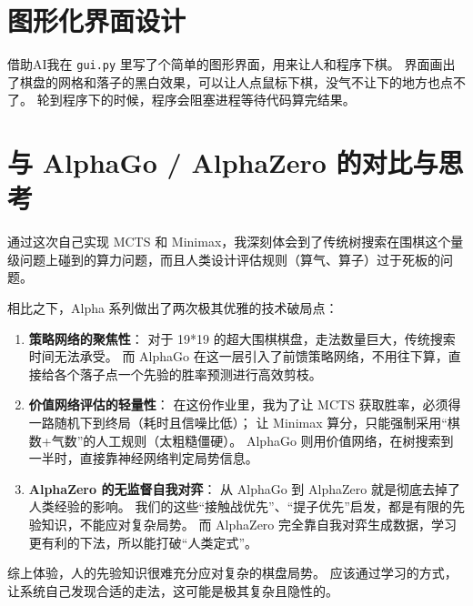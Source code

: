 \documentclass[12pt,a4paper,UTF8]{ctexart}
\begin{document}
\section{图形化界面设计}
借助AI我在 \texttt{gui.py} 里写了个简单的图形界面，用来让人和程序下棋。
界面画出了棋盘的网格和落子的黑白效果，可以让人点鼠标下棋，没气不让下的地方也点不了。
轮到程序下的时候，程序会阻塞进程等待代码算完结果。

\section{与 AlphaGo / AlphaZero 的对比与思考}
通过这次自己实现 MCTS 和 Minimax，我深刻体会到了传统树搜索在围棋这个量级问题上碰到的算力问题，而且人类设计评估规则（算气、算子）过于死板的问题。

相比之下，Alpha 系列做出了两次极其优雅的技术破局点：
\begin{enumerate}
    \item \textbf{策略网络的聚焦性}：
    对于 19*19 的超大围棋棋盘，走法数量巨大，传统搜索时间无法承受。
    而 AlphaGo 在这一层引入了前馈策略网络，不用往下算，直接给各个落子点一个先验的胜率预测进行高效剪枝。
    \item \textbf{价值网络评估的轻量性}：
    在这份作业里，我为了让 MCTS 获取胜率，必须得一路随机下到终局（耗时且信噪比低）；
    让 Minimax 算分，只能强制采用“棋数+气数”的人工规则（太粗糙僵硬）。
    AlphaGo 则用价值网络，在树搜索到一半时，直接靠神经网络判定局势信息。
    \item \textbf{AlphaZero 的无监督自我对弈}：
    从 AlphaGo 到 AlphaZero 就是彻底去掉了人类经验的影响。
    我们的这些“接触战优先”、“提子优先”启发，都是有限的先验知识，不能应对复杂局势。
    而 AlphaZero 完全靠自我对弈生成数据，学习更有利的下法，所以能打破“人类定式”。
\end{enumerate}

综上体验，人的先验知识很难充分应对复杂的棋盘局势。
应该通过学习的方式，让系统自己发现合适的走法，这可能是极其复杂且隐性的。
\end{document}
